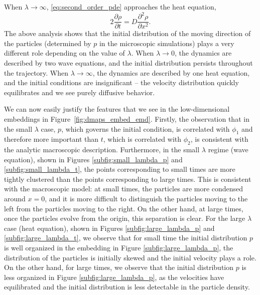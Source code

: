 \documentclass[prl, reprint, final, showkeys]{revtex4-1}
\begin{document}
When $\lambda \rightarrow \infty$, \eqref{eq:second_order_pde} approaches the heat equation,
\begin{equation}
2 \frac{\partial \rho}{\partial t} = D \frac{\partial ^2 \rho}{\partial x^2}.
\end{equation}
%
%
The above analysis shows that the initial distribution of the moving direction of the particles (determined by $p$ in the microscopic simulations) plays a very different role depending on the value of $\lambda$.
%
When $\lambda \rightarrow 0$, the dynamics are described by two wave equations, and the initial distribution persists throughout the trajectory.
%
When $\lambda \rightarrow \infty$, the dynamics are described by one heat equation, and the initial conditions are insignificant -- the velocity distribution quickly equilibrates and we see purely diffusive behavior.

We can now easily justify the features that we see in the low-dimensional embeddings in Figure~\ref{fig:dmaps_embed_emd}.
%
Firstly, the observation that in the small $\lambda$ case, $p$, which governs the initial condition, is correlated with $\phi_1$ and therefore more important than $t$, which is correlated with $\phi_2$, is consistent with the analytic macroscopic description. 
%
Furthermore, in the small $\lambda$ regime (wave equation), shown in Figures \ref{subfig:small_lambda_p} and \ref{subfig:small_lambda_t}, the points corresponding to small times are more tightly clustered than the points corresponding to large times.
%
This is consistent with the macroscopic model: at small times, the particles are more condensed around $x=0$, and it is more difficult to distinguish the particles moving to the left from the particles moving to the right. 
%
On the other hand, at large times, once the particles evolve from the origin, this separation is clear.  
%
For the large $\lambda$ case (heat equation), shown in Figures \ref{subfig:large_lambda_p} and \ref{subfig:large_lambda_t}, we observe that for small time the initial distribution $p$ is well organized in the embedding in Figure \ref{subfig:large_lambda_p}, the distribution of the particles is initially skewed and the initial velocity plays a role. 
%
On the other hand, for large times, we observe that the initial distribution $p$ is less organized in Figure \ref{subfig:large_lambda_p}, as the velocities have equilibrated and the initial distribution is less detectable in the particle density.
\end{document}

